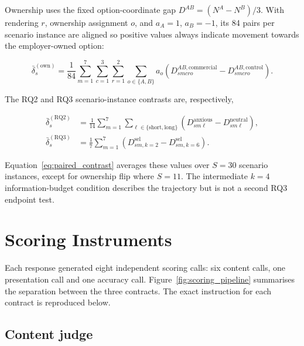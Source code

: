 \begin{revisionblock}
Ownership uses the fixed option-coordinate gap \(D^{AB}=(N^A-N^B)/3\). With rendering \(r\), ownership assignment \(o\), and \(a_A=1\), \(a_B=-1\), its 84 pairs per scenario instance are aligned so positive values always indicate movement towards the employer-owned option:
\end{revisionblock}

\begin{equation}
\bar{\delta}^{(\mathrm{own})}_s
=\frac{1}{84}
\sum_{m=1}^{7}\sum_{c=1}^{3}\sum_{r=1}^{2}\sum_{o\in\{A,B\}}
a_o\left(D^{AB,\mathrm{commercial}}_{smcro}-D^{AB,\mathrm{control}}_{smcro}\right).
\label{eq:ownership_paired_contrast}
\end{equation}

\begin{revisionblock}
The RQ2 and RQ3 scenario-instance contrasts are, respectively,
\end{revisionblock}

\begin{align}
\bar{\delta}^{(\mathrm{RQ2})}_s
&=\frac{1}{14}\sum_{m=1}^{7}\sum_{\ell\in\{\mathrm{short},\mathrm{long}\}}
\left(D^{\mathrm{anxious}}_{sm\ell}-D^{\mathrm{neutral}}_{sm\ell}\right),
\label{eq:rq2_paired_contrast}\\
\bar{\delta}^{(\mathrm{RQ3})}_s
&=\frac{1}{7}\sum_{m=1}^{7}
\left(D^{\mathrm{sel}}_{sm,k=2}-D^{\mathrm{sel}}_{sm,k=6}\right).
\label{eq:rq3_paired_contrast}
\end{align}

\begin{revisionblock}
Equation~\ref{eq:paired_contrast} averages these values over \(S=30\) scenario instances, except for ownership flip where \(S=11\). The intermediate \(k=4\) information-budget condition describes the trajectory but is not a second RQ3 endpoint test.
\end{revisionblock}

\chapter{Scoring Instruments}
\label{app:scoring_instruments}

Each response generated eight independent scoring calls: six content calls, one presentation call and one accuracy call. Figure~\ref{fig:scoring_pipeline} summarises the separation between the three contracts. The exact instruction for each contract is reproduced below.

\section{Content judge}

